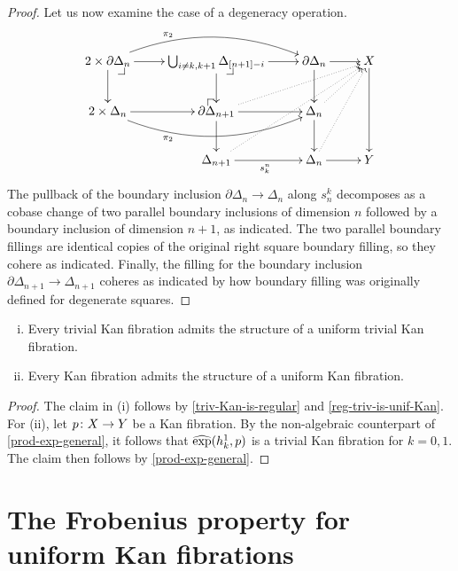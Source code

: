 \documentclass[reqno,10pt,a4paper,oneside]{amsart}
\begin{document}
\begin{proof}
Let us now examine the case of a degeneracy operation.
\[
\xymatrix{
  2 \times \partial \Delta_n
  \ar[r]
  \ar[d]
  \ar@/^2em/[rr]^(0.3){\pi_2}
  \pullback{dr}
&
  \bigcup_{i \neq k, k+1} \Delta_{[n+1] - i}
  \ar[r]
  \ar[d]
  \pullback{dr}
&
  \partial \Delta_n
  \ar[d]
  \ar[r]
&
  X
  \ar[dd]
\\
  2 \times \Delta_n
  \ar[r]
  \ar@/_2em/[rr]_(0.3){\pi_2}
&
  \partial \Delta_{n+1}
  \ar[r]
  \ar[d]
  \ar@{.>}[urr]
  \pullback{ul}
&
  \Delta_n
  \ar[d]
  \ar@{.>}[ur]
\\&
  \Delta_{n+1}
  \ar[r]_{s_k^n}
  \ar@{.>}[uurr]
&
  \Delta_n
  \ar[r]
  \ar@{.>}[uur]
&
  Y
}
\]
The pullback of the boundary inclusion $\partial \Delta_n \to \Delta_n$ along $s^k_n$ decomposes as a cobase change of two parallel boundary inclusions of dimension $n$ followed by a boundary inclusion of dimension $n+1$,
as indicated.
The two parallel boundary fillings are identical copies of the original right square boundary filling, so they cohere as indicated.
Finally, the filling for the boundary inclusion~$\partial \Delta_{n+1} \to \Delta_{n+1}$ coheres as indicated by how boundary filling was originally defined for degenerate squares.
\end{proof}











\begin{theorem}[ZFC]  \hfill 
\begin{enumerate}[(i)]
\item  Every trivial Kan fibration admits the structure of a uniform trivial Kan fibration.
\item Every Kan fibration admits the structure of a uniform  Kan fibration.
\end{enumerate} 
\end{theorem}

\begin{proof} The claim in (i) follows by \cref{triv-Kan-is-regular}  and \cref{reg-triv-is-unif-Kan}. For (ii), let
$p \colon X \to Y$ be a Kan fibration. By the non-algebraic counterpart of \cref{prod-exp-general}, it follows 
that $\operatorname{\widehat{exp}}(h_k^1, p)$ is a trivial Kan fibration for $k = 0, 1$. The claim then follows  by \cref{prod-exp-general}. 
\end{proof}




\section{The Frobenius property for uniform Kan fibrations} 
\end{document}
